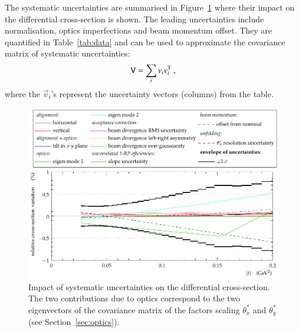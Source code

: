 The systematic uncertainties are summarised in Figure~\ref{fig:syst unc} where their impact on the differential cross-section is shown. The leading uncertainties include normalisation, optics imperfections and beam momentum offset. They are quantified in Table~\ref{tab:data} and can be used to approximate the covariance matrix of systematic uncertainties:
\begin{equation}
\label{eq:covar mat}
\mathsf{V} = \sum_{i} v_i v_i^{\rm T}\ ,
\end{equation}
where the $\vec v_i$'s represent the uncertainty vectors (columns) from the table.

\begin{figure}[t]
\begin{center}
\includegraphics[width=13cm]{fig/direct_method_mode_cmp_presentation.pdf}
\caption{%
Impact of systematic uncertainties on the differential cross-section. The two contributions due to optics correspond to the two eigenvectors of the covariance matrix of the factors scaling $\theta_x^*$ and $\theta_y^*$ (see Section~\ref{sec:optics}).
}
\label{fig:syst unc}
\end{center}
\end{figure}



